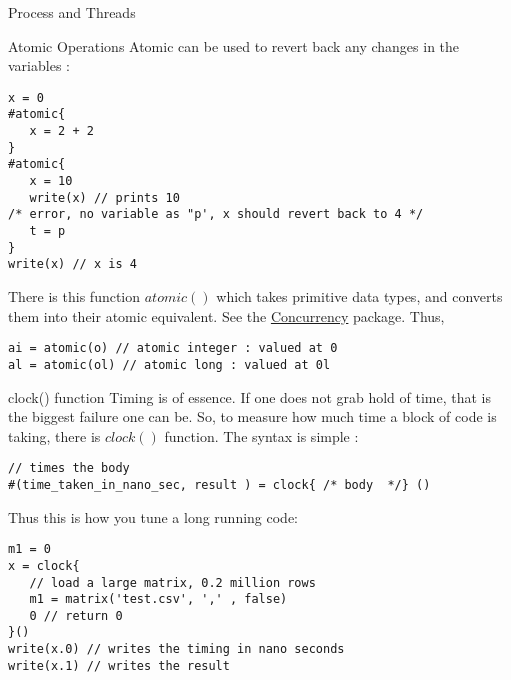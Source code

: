 \begin{section}{Process and Threads}
\begin{subsection}{Atomic Operations}
Atomic can be used to revert back any changes in the variables :
\begin{lstlisting}[style=JexlStyle]
x = 0 
#atomic{
   x = 2 + 2    
}
#atomic{
   x = 10
   write(x) // prints 10 
/* error, no variable as "p', x should revert back to 4 */   
   t = p
}
write(x) // x is 4 
\end{lstlisting}

There is this function $atomic()$ which takes primitive data types,
and converts them into their atomic equivalent.
See the \href{https://docs.oracle.com/javase/8/docs/api/java/util/concurrent/atomic/package-summary.html}{Concurrency} package.
Thus, 

\begin{lstlisting}[style=JexlStyle]
ai = atomic(o) // atomic integer : valued at 0  
al = atomic(ol) // atomic long : valued at 0l  
\end{lstlisting}

\end{subsection}

\begin{subsection}{clock() function}
Timing is of essence. If one does not grab hold of time, that is the biggest failure one can be.
So, to measure how much time a block of code is taking, there is $clock()$ function.
The syntax is simple :

\begin{lstlisting}[style=JexlStyle]
// times the body
#(time_taken_in_nano_sec, result ) = clock{ /* body  */} ()   
\end{lstlisting}

Thus this is how you tune a long running code:

\begin{lstlisting}[style=JexlStyle]
m1 = 0 
x = clock{
   // load a large matrix, 0.2 million rows 
   m1 = matrix('test.csv', ',' , false)
   0 // return 0 
}()
write(x.0) // writes the timing in nano seconds 
write(x.1) // writes the result 
\end{lstlisting}

\end{subsection}

\end{section}

